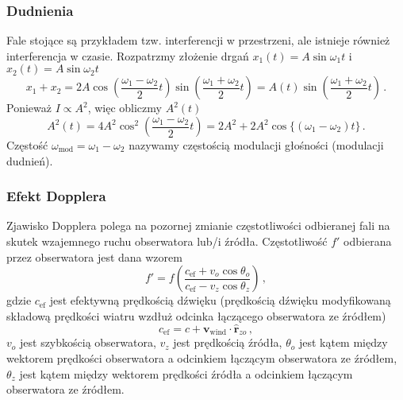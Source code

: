 \documentclass[../main.tex]{subfiles}
\begin{document}
        \subsubsection{Dudnienia}
        Fale stojące są przykładem tzw. interferencji w przestrzeni, ale istnieje również
        interferencja w czasie. Rozpatrzmy złożenie drgań \(x_1(t)=A\sin\omega_1t\) i
        \(x_2(t)=A\sin\omega_2t\)
        \begin{equation*}
            x_1+x_2=2A\cos\left(\frac{\omega_1-\omega_2}{2}t\right)\sin\left(\frac{\omega_1+\omega_2}{2}t\right)=A(t)\sin\left(\frac{\omega_1+\omega_2}{2}t\right)\,.
        \end{equation*}
        Ponieważ \(I\propto A^2\), więc obliczmy \(A^2(t)\)
        \begin{equation*}
            A^2(t)=4A^2\cos^2\left(\frac{\omega_1-\omega_2}{2}t\right)=2A^2+2A^2\cos\{(\omega_1-\omega_2)t\}\,.
        \end{equation*}
        Częstość \(\omega_\text{mod}=\omega_1-\omega_2\) nazywamy częstością modulacji głośności
        (modulacji dudnień).
        
        \subsubsection{Efekt Dopplera}
        Zjawisko Dopplera polega na pozornej zmianie częstotliwości odbieranej fali na skutek
        wzajemnego ruchu obserwatora lub/i źródła. Częstotliwość \(f'\) odbierana przez obserwatora
        jest dana wzorem
        \begin{equation*}
            f'=f\left(\frac{c_\text{ef}+ v_o\cos\theta_o}{c_\text{ef}- v_z\cos\theta_z}\right)\,,
        \end{equation*}
        gdzie \(c_\text{ef}\) jest efektywną prędkością dźwięku (prędkością dźwięku modyfikowaną
        składową prędkości wiatru wzdłuż odcinka łączącego obserwatora ze źródłem)
        \begin{equation*}
            c_\text{ef}=c+\mathbf{v}_\text{wind}\cdot \mathbf{\hat r}_{zo}\,,
        \end{equation*}
        \(v_o\) jest szybkością obserwatora, \(v_z\) jest prędkością źródła, \(\theta_o\) jest kątem
        między wektorem prędkości obserwatora a odcinkiem łączącym obserwatora ze źródłem,
        \(\theta_z\) jest kątem między wektorem prędkości źródła a odcinkiem łączącym obserwatora ze
        źródłem.
        
\end{document}
